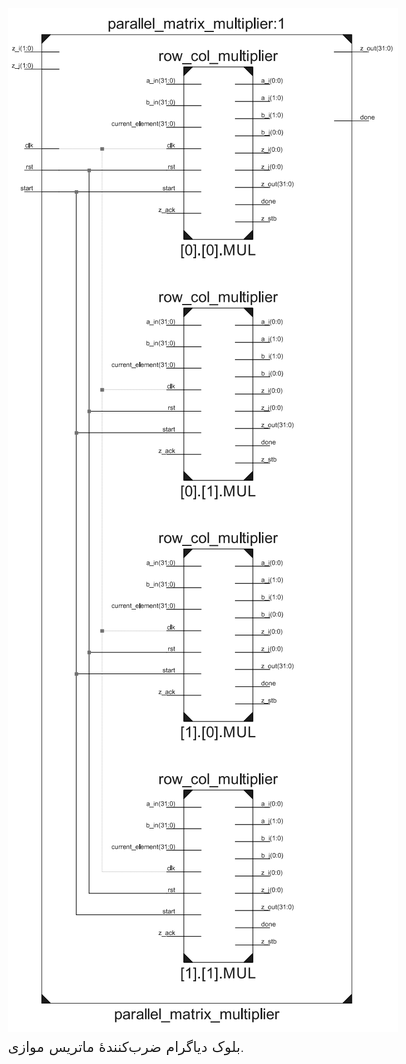 \documentclass[conference]{IEEEtran-ModifiedForMVIP}
\begin{document}
\begin{figure}[t]
\centering 
\includegraphics[width=.8\linewidth]{Images/ParallelBD.png}
\caption{
\centering
بلوک دیاگرام ضرب‌کنندهٔ ماتریس موازی.
}\label{fig:ParallelBD}
\end{figure}
\end{document}
